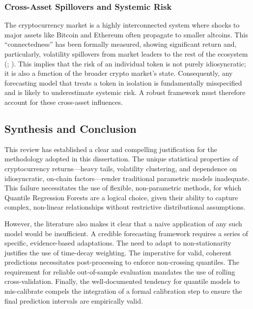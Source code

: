 \documentclass[
  a4paper,
  DIV=11,
  numbers=noendperiod]{scrreprt}
\begin{document}
\subsubsection{Cross-Asset Spillovers and Systemic
Risk}\label{cross-asset-spillovers-and-systemic-risk}

The cryptocurrency market is a highly interconnected system where shocks
to major assets like Bitcoin and Ethereum often propagate to smaller
altcoins. This ``connectedness'' has been formally measured, showing
significant return and, particularly, volatility spillovers from market
leaders to the rest of the ecosystem (; ). This
implies that the risk of an individual token is not purely
idiosyncratic; it is also a function of the broader crypto market's
state. Consequently, any forecasting model that treats a token in
isolation is fundamentally misspecified and is likely to underestimate
systemic risk. A robust framework must therefore account for these
cross-asset influences.

\subsection{Synthesis and Conclusion}\label{synthesis-and-conclusion}

This review has established a clear and compelling justification for the
methodology adopted in this dissertation. The unique statistical
properties of cryptocurrency returns---heavy tails, volatility
clustering, and dependence on idiosyncratic, on-chain factors---render
traditional parametric models inadequate. This failure necessitates the
use of flexible, non-parametric methods, for which Quantile Regression
Forests are a logical choice, given their ability to capture complex,
non-linear relationships without restrictive distributional assumptions.

However, the literature also makes it clear that a naive application of
any such model would be insufficient. A credible forecasting framework
requires a series of specific, evidence-based adaptations. The need to
adapt to non-stationarity justifies the use of time-decay weighting. The
imperative for valid, coherent predictions necessitates post-processing
to enforce non-crossing quantiles. The requirement for reliable
out-of-sample evaluation mandates the use of rolling cross-validation.
Finally, the well-documented tendency for quantile models to
mis-calibrate compels the integration of a formal calibration step to
ensure the final prediction intervals are empirically valid.
\end{document}
